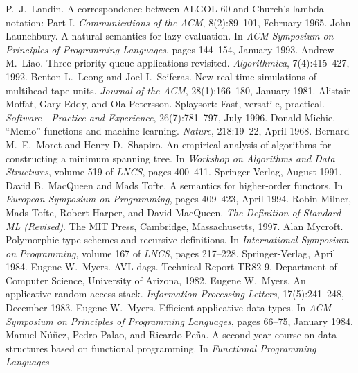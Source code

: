 \begin{thebibliography}{XXXXXXX}
 P.~J.~Landin. A correspondence between
  ALGOL 60 and Church's lambda-notation: Part
  I. \textit{Communications of the ACM}, 8(2):89--101, February 1965.
 John Launchbury. A natural semantics
  for lazy evaluation. In \textit{ACM Symposium on Principles of
    Programming Languages}, pages 144--154, January 1993.
 Andrew M.~Liao. Three priority queue
  applications revisited. \textit{Algorithmica}, 7(4):415--427, 1992.
 Benton L.~Leong and Joel
  I.~Seiferas. New real-time simulations of multihead tape
  units. \textit{Journal of the ACM}, 28(1):166--180, January 1981.
 Alistair Moffat, Gary Eddy,
  and Ola Petersson. Splaysort: Fast, versatile,
  practical. \textit{Software---Practice and Experience},
  26(7):781--797, July 1996.
 Donald Michie. ``Memo'' functions and
  machine learning. \textit{Nature}, 218:19--22, April 1968.
 Bernard M.~E.~Moret and Henry
  D.~Shapiro. An empirical analysis of algorithms for constructing a
  minimum spanning tree. In \textit{Workshop on Algorithms and Data
    Structures}, volume 519 of \textit{LNCS}, pages
  400--411. Springer-Verlag, August 1991.
 David B.~MacQueen and Mads Tofte. A
  semantics for higher-order functors. In \textit{European Symposium
    on Programming}, pages 409--423, April 1994.
 Robin Milner, Mads Tofte, Robert
  Harper, and David MacQueen. \textit{The Definition of Standard ML
    (Revised)}. The MIT Press, Cambridge, Massachusetts, 1997.
 Alan Mycroft. Polymorphic type schemes
  and recursive definitions. In \textit{International Symposium on
    Programming}, volume 167 of \textit{LNCS}, pages
  217--228. Springer-Verlag, April 1984.
 Eugene W.~Myers. AVL dags. Technical Report
  TR82-9, Department of Computer Science, University of Arizona, 1982.
 Eugene W.~Myers. An applicative
  random-access stack. \textit{Information Processing Letters},
  17(5):241--248, December 1983.
 Eugene W.~Myers. Efficient applicative data
  types. In \textit{ACM Symposium on Principles of Programming
    Languages}, pages 66--75, January 1984.
 Manuel N\'u\~nez, Pedro Palao, and
  Ricardo Pe\~na. A second year course on data structures based on
  functional programming. In \textit{Functional Programming Languages
}
\end{thebibliography}
